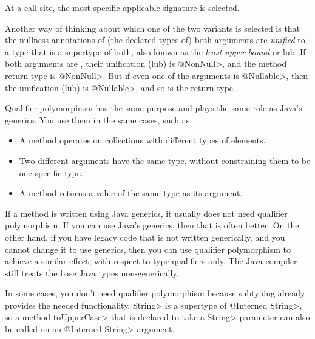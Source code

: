 \noindent
At a call site, the most specific applicable signature is selected.

Another way of thinking about which one of the two  variants is
selected is that the nullness annotations of (the declared types of) both
arguments are \emph{unified} to a type that is a supertype of both, also
known as the \emph{least upper bound} or lub.  If both
arguments are , their unification (lub) is \<@NonNull>, and the
method return type is \<@NonNull>.  But if even one of the arguments is \<@Nullable>,
then the unification (lub) is \<@Nullable>, and so is the return type.




Qualifier polymorphism has the same purpose and plays the same role as
Java's generics.  You use them in the same cases, such as:
\begin{itemize}
\item
  A method operates on collections with different types of
  elements.
\item
  Two different arguments have the same type, without constraining them to
  be one specific type.
\item
  A method returns a value of the same type as its argument.
\end{itemize}


If a method is written using Java generics, it usually does not need
qualifier polymorphism.  If you can use Java's generics, then that is often
better.  On the other hand, if you have legacy code that is not
written generically, and you cannot change it to use generics, then you can
use qualifier polymorphism to achieve a similar effect, with respect to
type qualifiers only.  The Java compiler still treats the base Java types
non-generically.

In some cases, you don't need qualifier polymorphism because subtyping
already provides the needed functionality.
\<String> is a supertype of \<@Interned String>, so a method \<toUpperCase>
that is declared to take a \<String> parameter can also be called on an
\<@Interned String> argument.

